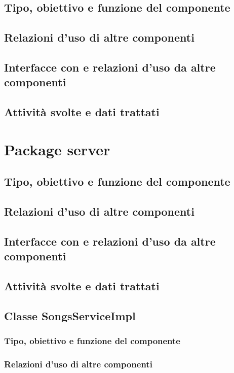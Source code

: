 \subsection*{Tipo, obiettivo e funzione del componente}
\subsection*{Relazioni d'uso di altre componenti}
\subsection*{Interfacce con e relazioni d'uso da altre componenti}
\subsection*{Attivit\`a svolte e dati trattati}
\newpage
\section{Package server} %
\subsection*{Tipo, obiettivo e funzione del componente}
\subsection*{Relazioni d'uso di altre componenti}
\subsection*{Interfacce con e relazioni d'uso da altre componenti}
\subsection*{Attivit\`a svolte e dati trattati}

\subsection{Classe SongsServiceImpl}
\subsubsection*{Tipo, obiettivo e funzione del componente}
\subsubsection*{Relazioni d'uso di altre componenti}
